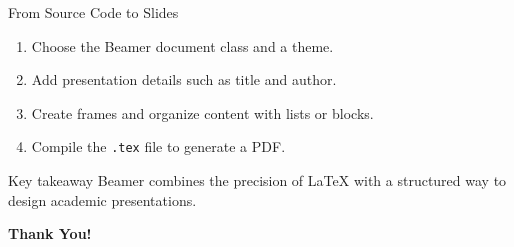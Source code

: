 \documentclass[aspectratio=169,11pt]{beamer}
\begin{document}
\begin{frame}{From Source Code to Slides}
    \begin{enumerate}
        \item Choose the Beamer document class and a theme.
        \item Add presentation details such as title and author.
        \item Create frames and organize content with lists or blocks.
        \item Compile the \texttt{.tex} file to generate a PDF.
    \end{enumerate}

    \vspace{0.35cm}
    \begin{block}{Key takeaway}
        Beamer combines the precision of LaTeX with a structured way to design academic presentations.
    \end{block}

    \vfill
    \centering
    \Large\textbf{Thank You!}
\end{frame}
\end{document}
